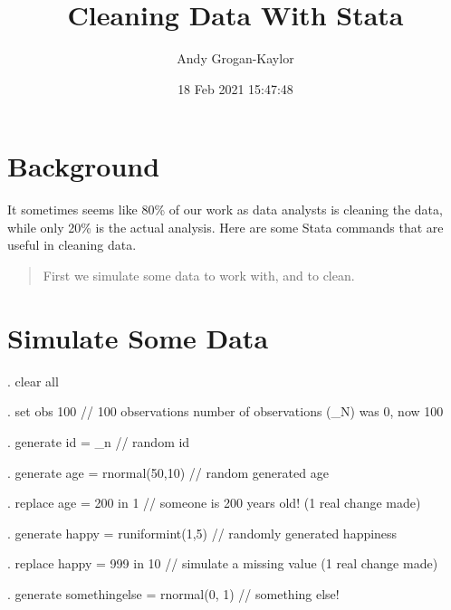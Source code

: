 \documentclass[]{article}
\title{Cleaning Data With Stata}
\author{Andy Grogan-Kaylor}
\date{18 Feb 2021 15:47:48}
\begin{document}
\maketitle

\section{Background}\label{background}

It sometimes seems like 80\% of our work as data analysts is cleaning
the data, while only 20\% is the actual analysis. Here are some Stata
commands that are useful in cleaning data.

\begin{quote}
First we simulate some data to work with, and to clean.
\end{quote}

\section{Simulate Some Data}\label{simulate-some-data}

\begin{stlog}
. clear all 
\end{stlog}

\begin{stlog}
. set obs 100 // 100 observations
number of observations (_N) was 0, now 100
\end{stlog}

\begin{stlog}
. generate id = _n // random id 
\end{stlog}

\begin{stlog}
. generate age = rnormal(50,10) // random generated age
\end{stlog}

\begin{stlog}
. replace age = 200 in 1 // someone is 200 years old!
(1 real change made)
\end{stlog}

\begin{stlog}
. generate happy = runiformint(1,5) // randomly generated happiness
\end{stlog}

\begin{stlog}
. replace happy = 999 in 10 // simulate a missing value
(1 real change made)
\end{stlog}

\begin{stlog}
. generate somethingelse = rnormal(0, 1) // something else!
\end{stlog}
\end{document}
